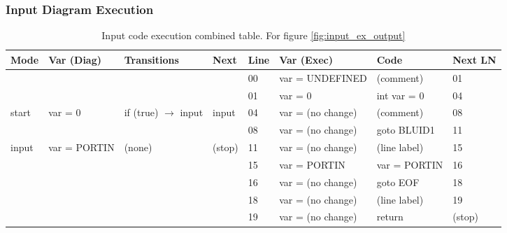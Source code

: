 \subsubsection{Input Diagram Execution}

\begin{table}[htcb]
	\caption{Input code execution combined table. For figure \ref{fig:input_ex_output}}
	\centering
	\tablefontsize
		\begin{tabular}{| p{} | p{} | p{} | p{} | p{} | p{} | p{} | p{} |}
			\hline
			\textbf{Mode} 		&	\textbf{Var (Diag)} 		& 	\textbf{Transitions} 		& 	\textbf{Next}		&	\textbf{Line}		&	\textbf{Var (Exec)	}	&	\textbf{Code}	&	\textbf{Next LN} \\
			\hline			
								&								&								&						&	00					& 	var = UNDEFINED			&	(comment)		&	01	\\
			\hline
								&								&								&						&	01					&	var = 0					&	int var = 0		&	04	\\
			\hline
			start 				&	var = 0						&if (true) $\rightarrow$ input	&	input				&	04					&	var = (no change)		& 	(comment)		&	08	\\
			\hline
								&								&								&						&	08					&	var = (no change)		&	goto BLUID1		&	11	\\
			\hline
			input				&	var = PORTIN				&	(none)						&	(stop)				&	11					&	var = (no change)		&	(line label)	&	15	\\
			\hline
								&								&								&						&	15					&	var = PORTIN			&	var = PORTIN	&	16	\\
			\hline
								&								&								&						&	16					&	var = (no change)		&	goto EOF		&	18	\\
			\hline
								&								&								&						&	18					&	var = (no change)		&	(line label)	&	19	\\
			\hline
								&								&								&						&	19					&	var = (no change)		&	return			&	(stop)	\\
			\hline
		\end{tabular}
	\label{table:InputExecCombined}
\end{table}

